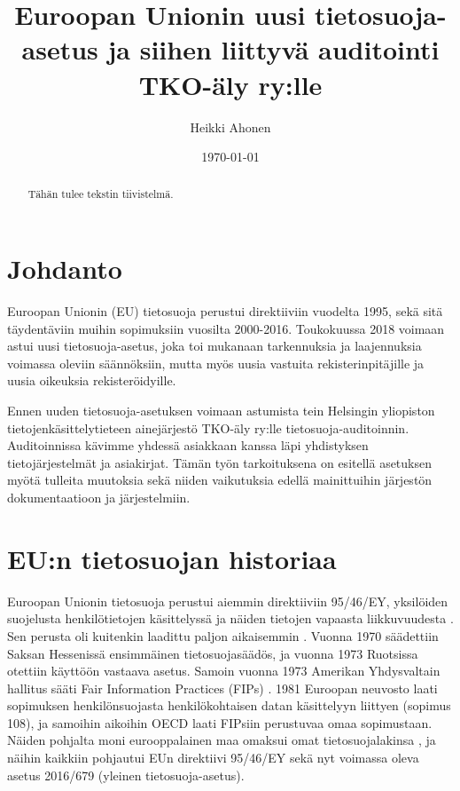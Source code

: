 \documentclass[finnish]{tktltiki}
\begin{document}
\singlespacing

\title{Euroopan Unionin uusi tietosuoja-asetus ja siihen liittyvä auditointi TKO-äly ry:lle}
\author{Heikki Ahonen}
\date{\today}

\maketitle





\begin{abstract}

Tähän tulee tekstin tiivistelmä.

\end{abstract}

\mytableofcontents

\section{Johdanto}

Euroopan Unionin (EU) tietosuoja perustui direktiiviin vuodelta 1995, sekä sitä täydentäviin muihin sopimuksiin vuosilta 2000-2016. Toukokuussa 2018 voimaan astui uusi tietosuoja-asetus, joka toi mukanaan tarkennuksia ja laajennuksia voimassa oleviin säännöksiin, mutta myös uusia vastuita rekisterinpitäjille ja uusia oikeuksia rekisteröidyille. 

Ennen uuden tietosuoja-asetuksen voimaan astumista tein Helsingin yliopiston tietojenkäsittelytieteen ainejärjestö TKO-äly ry:lle tietosuoja-auditoinnin. Auditoinnissa kävimme yhdessä asiakkaan kanssa läpi yhdistyksen tietojärjestelmät ja asiakirjat. Tämän työn tarkoituksena on esitellä asetuksen myötä tulleita muutoksia sekä niiden vaikutuksia edellä mainittuihin järjestön dokumentaatioon ja järjestelmiin.

\section{EU:n tietosuojan historiaa}

Euroopan Unionin tietosuoja perustui aiemmin direktiiviin 95/46/EY, yksilöiden suojelusta henkilötietojen käsittelyssä ja näiden tietojen vapaasta liikkuvuudesta \cite{eu95}. Sen perusta oli kuitenkin laadittu paljon aikaisemmin \cite{tikkinen}. Vuonna 1970 säädettiin Saksan Hessenissä ensimmäinen tietosuojasäädös, ja vuonna 1973 Ruotsissa otettiin käyttöön vastaava asetus. Samoin vuonna 1973 Amerikan Yhdysvaltain hallitus sääti Fair Information Practices (FIPs) \cite{tikkinen}. 1981 Euroopan neuvosto laati sopimuksen henkilönsuojasta henkilökohtaisen datan käsittelyyn liittyen (sopimus 108), ja samoihin aikoihin OECD laati FIPsiin perustuvaa omaa sopimustaan. Näiden pohjalta moni eurooppalainen maa omaksui omat tietosuojalakinsa \cite{tikkinen}, ja näihin kaikkiin pohjautui EUn direktiivi 95/46/EY sekä nyt voimassa oleva asetus 2016/679 (yleinen tietosuoja-asetus). 
\end{document}
